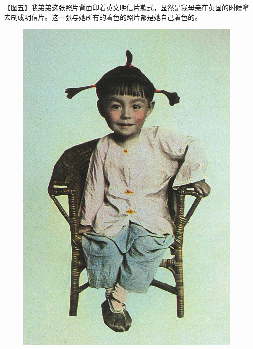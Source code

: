 \clearpage
\par 【图五】我弟弟这张照片背面印着英文明信片款式，显然是我母亲在英国的时候拿去制成明信片。这一张与她所有的着色的照片都是她自己着色的。
\begin{figure}[htb]
    \centering %
    \includegraphics[scale=0.4]{picture/对照记5.jpeg}
\end{figure}

